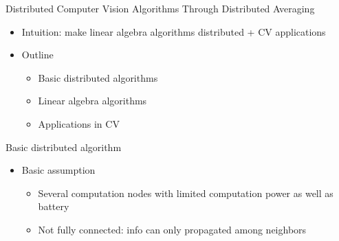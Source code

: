 \documentclass[12pt]{beamer}
\begin{document}
\begin{frame}{Distributed Computer Vision Algorithms Through Distributed Averaging}
    \begin{itemize}
        \item Intuition: make linear algebra algorithms distributed + CV applications
        \item Outline
        \begin{itemize}
            \item Basic distributed algorithms
            \item Linear algebra algorithms
            \item Applications in CV
        \end{itemize}
    \end{itemize}
\end{frame}

\begin{frame}{Basic distributed algorithm}
    \begin{itemize}
        \item Basic assumption
        \begin{itemize}
            \item Several computation nodes with limited computation power as well as battery
            \item Not fully connected: info can only propagated among neighbors
            \\  
        \end{itemize}
    \end{itemize}
\end{frame}
\end{document}
